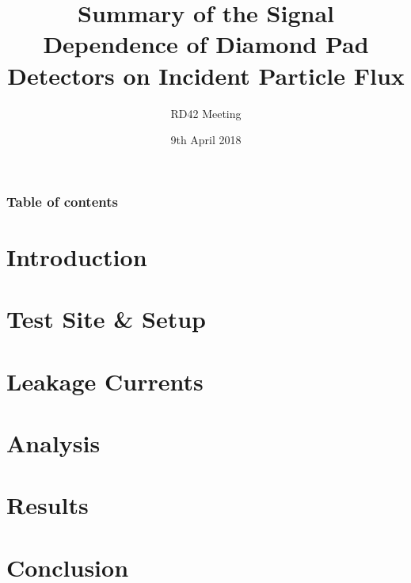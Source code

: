 \documentclass[9pt, xcolor=dvipsnames]{beamer}
\title[Pad Detectors]{Summary of the Signal Dependence of Diamond Pad Detectors on Incident Particle Flux}
\subtitle{RD42 Meeting}
\date{9th April 2018}
\begin{document}


\begin{frame}%
	\frametitle{Table of contents}
	\tableofcontents[hideallsubsections]   %
\end{frame}

\section{Introduction}


\section{Test Site \& Setup}


\section{Leakage Currents}


\section{Analysis}


\section{Results}


\section{Conclusion}






\end{document}
